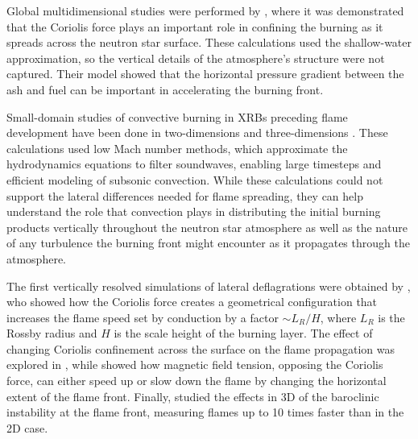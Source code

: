 \documentclass[trackchanges,preprint,times,tighten]{aastex63}
\begin{document}
Global multidimensional studies were performed by
\citet{spitkovsky2002}, where it was demonstrated that the Coriolis
force plays an important role in confining the burning as it spreads
across the neutron star surface.  These calculations used the
shallow-water approximation, so the vertical details of the
atmosphere's structure were not captured.  Their model showed that the
horizontal pressure gradient between the ash and fuel can be important
in accelerating the burning front.

Small-domain studies of convective burning in XRBs preceding flame
development have been done in two-dimensions \citep{lin:2006,xrb,xrb2}
and three-dimensions \citep{xrb3d}.  These calculations used low Mach
number methods, which approximate the hydrodynamics equations to filter
soundwaves, enabling large timesteps and efficient modeling of
subsonic convection.  While these calculations could not support
the lateral differences needed for flame spreading, they can help
 understand the role that convection plays in distributing the initial
burning products vertically throughout the neutron star atmosphere as well
as the nature of any turbulence the burning front might encounter as it propagates
through the atmosphere.

The first vertically resolved simulations of lateral deflagrations
were obtained by \citet{cavecchi:2013}, who showed how the Coriolis
force creates a geometrical configuration that increases the flame
speed set by conduction by a factor $\sim L_R / H$, where $L_R$ is the
Rossby radius and $H$ is the scale height of the burning layer. The
effect of changing Coriolis confinement across the surface on the flame 
propagation was explored in \citet{art-2015-cavecchi-etal},
while \citet{art-2016-cavecchi-etal} showed how magnetic field tension,
opposing the Coriolis force, can either speed up or slow down the flame by
changing the horizontal extent of the flame front. Finally, \citet{Cavecchi2019}
studied the effects in 3D of the baroclinic instability at the flame
front, measuring flames up to 10 times faster than in the 2D case.
\end{document}
